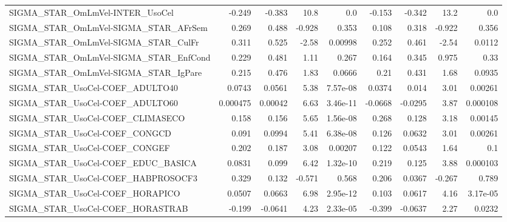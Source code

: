 \begin{tabular}{lrrrrrrrr}
SIGMA\_STAR\_OmLmVel-INTER\_UsoCel       &      -0.249 &       -0.383 &    10.8 &      0.0 &     -0.153 &      -0.342 &         13.2 &           0.0 \\
SIGMA\_STAR\_OmLmVel-SIGMA\_STAR\_AFrSem  &       0.269 &        0.488 &  -0.928 &    0.353 &      0.108 &       0.318 &       -0.922 &         0.356 \\
SIGMA\_STAR\_OmLmVel-SIGMA\_STAR\_CulFr   &       0.311 &        0.525 &   -2.58 &  0.00998 &      0.252 &       0.461 &        -2.54 &        0.0112 \\
SIGMA\_STAR\_OmLmVel-SIGMA\_STAR\_EnfCond &       0.229 &        0.481 &    1.11 &    0.267 &      0.164 &       0.345 &        0.975 &          0.33 \\
SIGMA\_STAR\_OmLmVel-SIGMA\_STAR\_IgPare  &       0.215 &        0.476 &    1.83 &   0.0666 &       0.21 &       0.431 &         1.68 &        0.0935 \\
SIGMA\_STAR\_UsoCel-COEF\_ADULTO40       &      0.0743 &       0.0561 &    5.38 & 7.57e-08 &     0.0374 &       0.014 &         3.01 &       0.00261 \\
SIGMA\_STAR\_UsoCel-COEF\_ADULTO60       &    0.000475 &      0.00042 &    6.63 & 3.46e-11 &    -0.0668 &     -0.0295 &         3.87 &      0.000108 \\
SIGMA\_STAR\_UsoCel-COEF\_CLIMASECO      &       0.158 &        0.156 &    5.65 & 1.56e-08 &      0.268 &       0.128 &         3.18 &       0.00145 \\
SIGMA\_STAR\_UsoCel-COEF\_CONGCD         &       0.091 &       0.0994 &    5.41 & 6.38e-08 &      0.126 &      0.0632 &         3.01 &       0.00261 \\
SIGMA\_STAR\_UsoCel-COEF\_CONGEF         &       0.202 &        0.187 &    3.08 &  0.00207 &      0.122 &      0.0543 &         1.64 &           0.1 \\
SIGMA\_STAR\_UsoCel-COEF\_EDUC\_BASICA    &      0.0831 &        0.099 &    6.42 & 1.32e-10 &      0.219 &       0.125 &         3.88 &      0.000103 \\
SIGMA\_STAR\_UsoCel-COEF\_HABPROSOCF3    &       0.329 &        0.132 &  -0.571 &    0.568 &      0.206 &      0.0367 &       -0.267 &         0.789 \\
SIGMA\_STAR\_UsoCel-COEF\_HORAPICO       &      0.0507 &       0.0663 &    6.98 & 2.95e-12 &      0.103 &      0.0617 &         4.16 &      3.17e-05 \\
SIGMA\_STAR\_UsoCel-COEF\_HORASTRAB      &      -0.199 &      -0.0641 &    4.23 & 2.33e-05 &     -0.399 &     -0.0637 &         2.27 &        0.0232 \\

\end{tabular}
